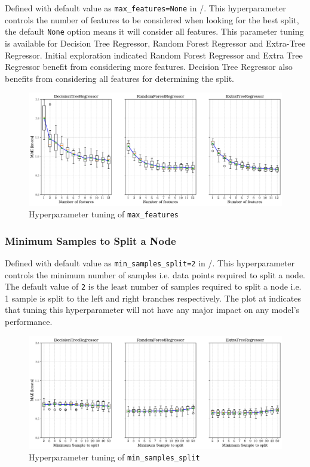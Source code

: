 Defined with default value as {\tt max\_features=None} in \scikit/. This hyperparameter controls the number of features to be considered when looking for the best split, the default {\tt None} option means it will consider all features. This parameter tuning is available for Decision Tree Regressor, Random Forest Regressor and Extra-Tree Regressor. Initial exploration indicated Random Forest Regressor and Extra Tree Regressor benefit from considering more features. Decision Tree Regressor also benefits from considering all features for determining the split.\\ 

\begin{figure}[h]
    \centering
        \includegraphics[width=.85\textwidth]{02_figures/hpo_n_features_mae.png}
        \caption{Hyperparameter tuning of {\tt max\_features}}
        \label{fig:hpo_n_features}
\end{figure}

\subsubsection*{Minimum Samples to Split a Node}\label{sec:min_samples_split}

Defined with default value as {\tt min\_samples\_split=2} in \scikit/. This hyperparameter controls the minimum number of samples i.e. data points required to split a node. The default value of {\tt 2} is the least number of samples required to split a node i.e. 1 sample is split to the left and right branches respectively. The plot at  indicates that tuning this hyperparameter will not have any major impact on any model's performance.\\
\begin{figure}[h]
    \centering
        \includegraphics[width=.85\textwidth]{02_figures/hpo_min_samples_split_mae.png}
        \caption{Hyperparameter tuning of {\tt min\_samples\_split}}
        \label{fig:hpo_min_samples_split}
\end{figure}

